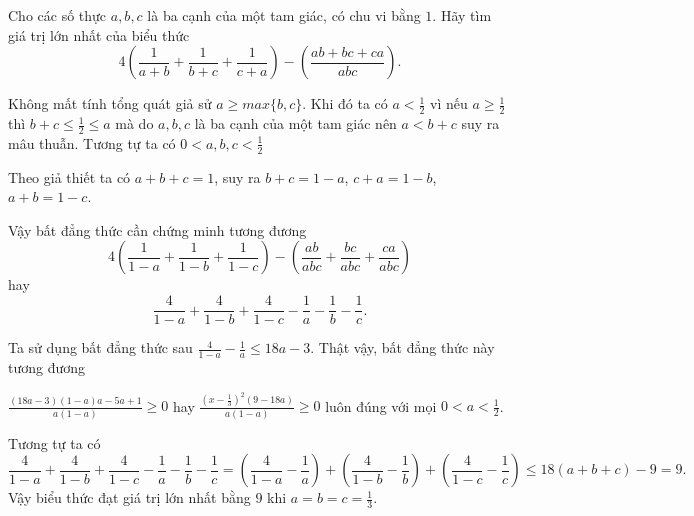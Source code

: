 \begin{problem}
    Cho các số thực $a, b, c$ là ba cạnh của một tam giác, có chu vi bằng $1$. Hãy tìm giá trị lớn nhất của biểu thức
    $$
        4\left(\frac{1}{a + b} + \frac{1}{b + c} + \frac{1}{c + a}\right) - \left(\frac{ab + bc + ca}{abc}\right).
    $$
    \solution
    
    Không mất tính tổng quát giả sử $a \ge max\{b, c\}$. Khi đó ta có $\displaystyle a < \frac{1}{2}$ vì nếu $\displaystyle a \ge \frac{1}{2}$ thì $ \displaystyle b + c \le \frac{1}{2} \le a$ mà do $a, b, c$ là ba cạnh của một tam giác nên $a < b + c$ suy ra mâu thuẫn. Tương tự ta có $\displaystyle 0 < a, b, c < \frac{1}{2}$
    
    Theo giả thiết ta có $a + b + c = 1$, suy ra $b + c = 1 - a$, $c + a = 1 - b$, $a + b = 1 - c$.
    
    Vậy bất đẳng thức cần chứng minh tương đương
    $$
        4\left(\frac{1}{1 - a} + \frac{1}{1 - b} + \frac{1}{1 - c}\right) - \left(\frac{ab}{abc} + \frac{bc}{abc} + \frac{ca}{abc}\right)
    $$
    hay 
    $$
        \frac{4}{1 - a} + \frac{4}{1 - b} + \frac{4}{1 - c} - \frac{1}{a} - \frac{1}{b} - \frac{1}{c}.
    $$
    
    Ta sử dụng bất đẳng thức sau $\displaystyle \frac{4}{1 - a} - \frac{1}{a} \le 18a - 3$. Thật vậy, bất đẳng thức này tương đương 
    
    $\displaystyle \frac{(18a - 3)(1 - a)a - 5a + 1}{a(1 - a)} \ge 0$ hay $\displaystyle \frac{\left(x - \frac{1}{3}\right)^2(9 - 18a)}{a(1 - a)} \ge 0$ luôn đúng với mọi $\displaystyle 0 < a < \frac{1}{2}$.
    
    Tương tự ta có
    $$
        \frac{4}{1 - a} + \frac{4}{1 - b} + \frac{4}{1 - c} - \frac{1}{a} - \frac{1}{b} - \frac{1}{c} =
        \left(\frac{4}{1 - a} - \frac{1}{a} \right) + \left(\frac{4}{1 - b} - \frac{1}{b}\right) + \left(\frac{4}{1 - c} - \frac{1}{c}\right) \le 18(a + b + c) - 9 = 9.
    $$
    Vậy biểu thức đạt giá trị lớn nhất bằng $9$ khi $\displaystyle a = b = c = \frac{1}{3}$.
\end{problem}
